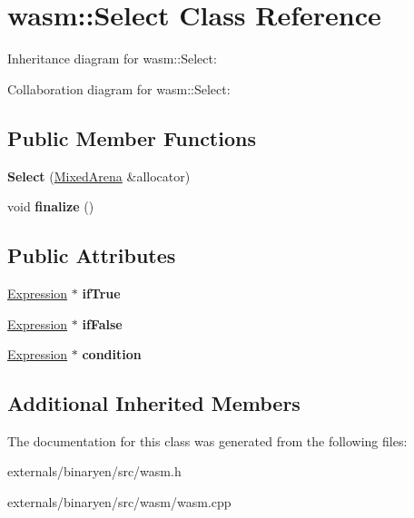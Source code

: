 \hypertarget{classwasm_1_1_select}{}\section{wasm\+:\+:Select Class Reference}
\label{classwasm_1_1_select}


Inheritance diagram for wasm\+:\+:Select\+:


Collaboration diagram for wasm\+:\+:Select\+:
\subsection*{Public Member Functions}
\begin{DoxyCompactItemize}
\item 
\mbox{\label{classwasm_1_1_select_a7f547d95c7ff8a8e8be08a1051421203}} 
{\bfseries Select} (\mbox{\hyperlink{struct_mixed_arena}{Mixed\+Arena}} \&allocator)
\item 
\mbox{\label{classwasm_1_1_select_a0c46666cacb7707afc144b55502e37a1}} 
void {\bfseries finalize} ()
\end{DoxyCompactItemize}
\subsection*{Public Attributes}
\begin{DoxyCompactItemize}
\item 
\mbox{\label{classwasm_1_1_select_af183dcc5e261bd4cd65329d11b7af221}} 
\mbox{\hyperlink{classwasm_1_1_expression}{Expression}} $\ast$ {\bfseries if\+True}
\item 
\mbox{\label{classwasm_1_1_select_aa9cb1350e8071959c16ae06a7adf0c30}} 
\mbox{\hyperlink{classwasm_1_1_expression}{Expression}} $\ast$ {\bfseries if\+False}
\item 
\mbox{\label{classwasm_1_1_select_a41a37168b6d03e68f53a4c7b9262eb73}} 
\mbox{\hyperlink{classwasm_1_1_expression}{Expression}} $\ast$ {\bfseries condition}
\end{DoxyCompactItemize}
\subsection*{Additional Inherited Members}


The documentation for this class was generated from the following files\+:\begin{DoxyCompactItemize}
\item 
externals/binaryen/src/wasm.\+h\item 
externals/binaryen/src/wasm/wasm.\+cpp\end{DoxyCompactItemize}
